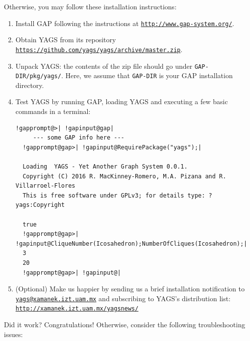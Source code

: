 \documentclass[a4paper,11pt]{report}
\begin{document}
{{Otherwise, you may follow these installation instructions: 
\begin{enumerate}
\item Install \textsf{GAP} following the instructions at \href{http://www.gap-system.org/} {\texttt{http://www.gap-system.org/}}. 
\item Obtain \textsf{YAGS} from its repository \href{https://github.com/yags/yags/archive/master.zip} {\texttt{https://github.com/yags/yags/archive/master.zip}}.
\item Unpack \textsf{YAGS}: the contents of the zip file should go under \texttt{GAP-DIR/pkg/yags/}. Here, we assume that \texttt{GAP-DIR} is your \textsf{GAP} installation directory.
\item Test \textsf{YAGS} by running \textsf{GAP}, loading \textsf{YAGS} and executing a few basic commands in a terminal: 

 
\begin{Verbatim}[commandchars=!@|,fontsize=\small,frame=single,label=Example]
  !gapprompt@>| !gapinput@gap|
     --- some GAP info here ---
  !gapprompt@gap>| !gapinput@RequirePackage("yags");|
  
  Loading  YAGS - Yet Another Graph System 0.0.1.
  Copyright (C) 2016 R. MacKinney-Romero, M.A. Pizana and R. Villarroel-Flores
  This is free software under GPLv3; for details type: ?yags:Copyright 
  
  true
  !gapprompt@gap>| !gapinput@CliqueNumber(Icosahedron);NumberOfCliques(Icosahedron);|
  3
  20
  !gapprompt@gap>| !gapinput@|
\end{Verbatim}

\item  (Optional) Make us happier by sending us a brief installation notification to \href{mailto://yags@xamanek.izt.uam.mx} {\texttt{yags@xamanek.izt.uam.mx}} and subscribing to \textsf{YAGS}'s distribution list: \href{http://xamanek.izt.uam.mx/yagsnews/} {\texttt{http://xamanek.izt.uam.mx/yagsnews/}} 
\end{enumerate}
 

Did it work? Congratulations! Otherwise, consider the following
troubleshooting issues: 


}}
\end{document}
